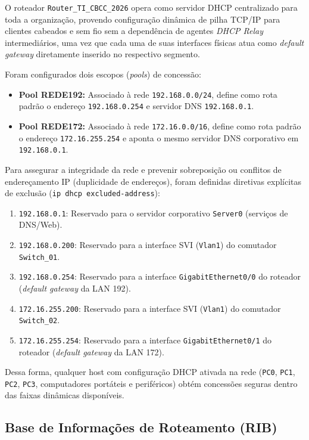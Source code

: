 O roteador \texttt{Router\_TI\_CBCC\_2026} opera como servidor DHCP centralizado para toda a organização, provendo configuração dinâmica de pilha TCP/IP para clientes cabeados e sem fio sem a dependência de agentes \textit{DHCP Relay} intermediários, uma vez que cada uma de suas interfaces físicas atua como \textit{default gateway} diretamente inserido no respectivo segmento.

Foram configurados dois escopos (\textit{pools}) de concessão:
\begin{itemize}[leftmargin=2em]
  \item \textbf{Pool REDE192:} Associado à rede \texttt{192.168.0.0/24}, define como rota padrão o endereço \texttt{192.168.0.254} e servidor DNS \texttt{192.168.0.1}.
  \item \textbf{Pool REDE172:} Associado à rede \texttt{172.16.0.0/16}, define como rota padrão o endereço \texttt{172.16.255.254} e aponta o mesmo servidor DNS corporativo em \texttt{192.168.0.1}.
\end{itemize}

Para assegurar a integridade da rede e prevenir sobreposição ou conflitos de endereçamento IP (duplicidade de endereços), foram definidas diretivas explícitas de exclusão (\texttt{ip dhcp excluded-address}):
\begin{enumerate}[leftmargin=2em]
  \item \texttt{192.168.0.1}: Reservado para o servidor corporativo \texttt{Server0} (serviços de DNS/Web).
  \item \texttt{192.168.0.200}: Reservado para a interface SVI (\texttt{Vlan1}) do comutador \texttt{Switch\_01}.
  \item \texttt{192.168.0.254}: Reservado para a interface \texttt{GigabitEthernet0/0} do roteador (\textit{default gateway} da LAN 192).
  \item \texttt{172.16.255.200}: Reservado para a interface SVI (\texttt{Vlan1}) do comutador \texttt{Switch\_02}.
  \item \texttt{172.16.255.254}: Reservado para a interface \texttt{GigabitEthernet0/1} do roteador (\textit{default gateway} da LAN 172).
\end{enumerate}

Dessa forma, qualquer host com configuração DHCP ativada na rede (\texttt{PC0}, \texttt{PC1}, \texttt{PC2}, \texttt{PC3}, computadores portáteis e periféricos) obtém concessões seguras dentro das faixas dinâmicas disponíveis.

\subsection{Base de Informações de Roteamento (RIB)}

